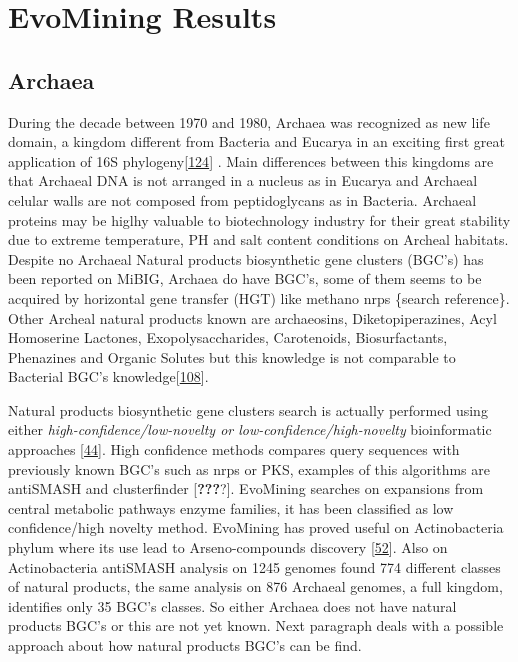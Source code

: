 \documentclass[12pt,twoside]{reedthesis}
\begin{document}
  \hypertarget{ref_labels}{\section{EvoMining Results}\label{ref_labels}}
  
  \subsection{Archaea}\label{archaea}
  
  During the decade between 1970 and 1980, Archaea was recognized as new
  life domain, a kingdom different from Bacteria and Eucarya in an
  exciting first great application of 16S
  phylogeny{[}\protect\hyperlink{ref-woese_phylogenetic_1977}{124}{]} .
  Main differences between this kingdoms are that Archaeal DNA is not
  arranged in a nucleus as in Eucarya and Archaeal celular walls are not
  composed from peptidoglycans as in Bacteria. Archaeal proteins may be
  higlhy valuable to biotechnology industry for their great stability due
  to extreme temperature, PH and salt content conditions on Archeal
  habitats. Despite no Archaeal Natural products biosynthetic gene
  clusters (BGC's) has been reported on MiBIG, Archaea do have BGC's, some
  of them seems to be acquired by horizontal gene transfer (HGT) like
  methano nrps \{search reference\}. Other Archeal natural products known
  are archaeosins, Diketopiperazines, Acyl Homoserine Lactones,
  Exopolysaccharides, Carotenoids, Biosurfactants, Phenazines and Organic
  Solutes but this knowledge is not comparable to Bacterial BGC's
  knowledge{[}\protect\hyperlink{ref-charlesworth_untapped_2015}{108}{]}.
  
  Natural products biosynthetic gene clusters search is actually performed
  using either \emph{high-confidence/low-novelty or
  low-confidence/high-novelty} bioinformatic approaches
  {[}\protect\hyperlink{ref-medema_computational_2015}{44}{]}. High
  confidence methods compares query sequences with previously known BGC's
  such as nrps or PKS, examples of this algorithms are antiSMASH and
  clusterfinder {[}{\textbf{???}}?{]}. EvoMining searches on expansions
  from central metabolic pathways enzyme families, it has been classified
  as low confidence/high novelty method. EvoMining has proved useful on
  Actinobacteria phylum where its use lead to Arseno-compounds discovery
  {[}\protect\hyperlink{ref-cruz-morales_phylogenomic_2016}{52}{]}. Also
  on Actinobacteria antiSMASH analysis on 1245 genomes found 774 different
  classes of natural products, the same analysis on 876 Archaeal genomes,
  a full kingdom, identifies only 35 BGC's classes. So either Archaea does
  not have natural products BGC's or this are not yet known. Next
  paragraph deals with a possible approach about how natural products
  BGC's can be find.
  
\end{document}
